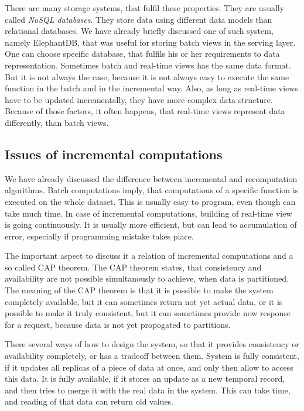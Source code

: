 There are many storage systems, that fulfil these properties.
They are usually called \textit{NoSQL databases}.
They store data using different data models than relational databases.
We have already briefly discussed one of such system, namely ElephantDB, that was useful for storing batch views in the serving layer.
One can choose specific database, that fulfils his or her requirements to data representation.
Sometimes batch and real-time views has the same data format.
But it is not always the case, because it is not always easy to execute the same function in the batch and in the incremental way.
Also, as long as real-time views have to be updated incrementally, they have more complex data structure.
Because of those factors, it often happens, that real-time views represent data differently, than batch views.

\subsection{Issues of incremental computations}

We have already discussed the difference between incremental and recomputation algorithms.
Batch computations imply, that computations of a specific function is executed on the whole dataset.
This is usually easy to program, even though can take much time.
In case of incremental computations, building of real-time view is going continuously.
It is usually more efficient, but can lead to accumulation of error, especially if programming mistake takes place.

The important aspect to discuss it a relation of incremental computations and a so called CAP theorem.
The CAP theorem states, that consistency and availability are not possible simultanously to achieve, when data is partitioned.
The meaning of the CAP theorem is that it is possible to make the system completely available, but it can sometimes return not yet actual data, or it is possible to make it truly consistent, but it can sometimes provide now response for a request, because data is not yet propogated to partitions.

There several ways of how to design the system, so that it provides consistency or availability completely, or has a tradeoff between them.
System is fully consistent, if it updates all replicas of a piece of data at once, and only then allow to access this data.
It is fully available, if it stores an update as a new temporal record, and then tries to merge it with the real data in the system.
This can take time, and reading of that data can return old values.

